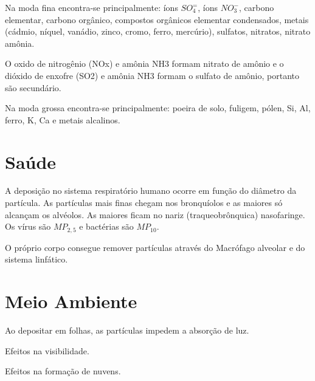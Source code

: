 
Na moda fina encontra-se principalmente: íons $SO_4^=$, 
íons $ NO_3^-$, carbono elementar, carbono orgânico, compostos orgânicos elementar
condensados, metais (cádmio, níquel, vanádio, zinco, cromo, ferro, mercúrio), 
sulfatos, nitratos, nitrato amônia. 

O oxido de nitrogênio (NOx) e amônia NH3 formam  nitrato de amônio e 
o dióxido de enxofre (SO2) e amônia NH3 formam o sulfato de amônio, 
portanto são secundário. 

Na moda grossa encontra-se principalmente: poeira de solo, fuligem, 
pólen, Si, Al, ferro, K, Ca e metais alcalinos.

\section{Saúde}

A deposição no sistema respiratório humano ocorre em função do diâmetro da partícula.
As partículas mais finas chegam nos bronquíolos e as maiores só alcançam os alvéolos.
As maiores ficam no nariz (traqueobrônquica) nasofaringe. 
Os vírus são $MP_{2,5}$ e bactérias são $MP_{10}$. 

O próprio corpo consegue remover partículas através do Macrófago alveolar 
e do sistema linfático. 

\section{Meio Ambiente}
Ao depositar em folhas, as partículas impedem a absorção de luz. 

Efeitos na visibilidade.

Efeitos na formação de nuvens.


